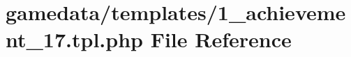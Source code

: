 \hypertarget{1__achievement__17_8tpl_8php}{\section{gamedata/templates/1\+\_\+achievement\+\_\+17.tpl.\+php File Reference}
\label{1__achievement__17_8tpl_8php}
}
